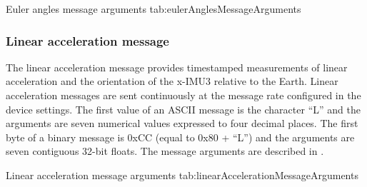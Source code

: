 \begingroup
    \def\tempArgumentA{Roll angle in degrees}
    \def\tempArgumentB{Pitch angle in degrees}
    \def\tempArgumentC{Yaw angle in degrees}
    \dataMessageTable
    {Euler angles message arguments}
    {tab:eulerAnglesMessageArguments}
\endgroup

\begingroup
    \def\tempNameA{Roll angle}
    \def\tempNameB{Pitch angle}
    \def\tempNameC{Yaw angle}
    \def\tempValueA{0}
    \def\tempValueB{0}
    \def\tempValueC{0}
    \def\tempAsciiFirst{A}
    \def\tempAsciiA{0.0000}
    \def\tempAsciiB{0.0000}
    \def\tempAsciiC{0.0000}
    \def\tempBinaryFirst{C1}
    \def\tempBinaryA{00 00 00 00}
    \def\tempBinaryB{00 00 00 00}
    \def\tempBinaryC{00 00 00 00}
    \dataMessageExample
\endgroup

\subsubsection{Linear acceleration message}

The linear acceleration message provides timestamped measurements of linear acceleration and the orientation of the x-IMU3 relative to the Earth.  Linear acceleration messages are sent continuously at the message rate configured in the device settings.  The first value of an \ac{ASCII} message is the character \enquote{L} and the arguments are seven numerical values expressed to four decimal places.  The first byte of a binary message is 0xCC (equal to 0x80 + \enquote{L}) and the arguments are seven contiguous 32-bit floats.  The message arguments are described in .

\begingroup
    \def\tempArgumentA{Quaternion W element}
    \def\tempArgumentB{Quaternion X element}
    \def\tempArgumentC{Quaternion Y element}
    \def\tempArgumentD{Quaternion Z element}
    \def\tempArgumentE{Linear acceleration X axis in g}
    \def\tempArgumentF{Linear acceleration Y axis in g}
    \def\tempArgumentG{Linear acceleration Z axis in g}
    \def\tempCaption{Linear acceleration message arguments}
    \def\tempLabel{tab:linearAccelerationMessageArguments}
    \dataMessageTable
    {Linear acceleration message arguments}
    {tab:linearAccelerationMessageArguments}
\endgroup

\begingroup
    \def\tempNameA{Quaternion W element}
    \def\tempNameB{Quaternion X element}
    \def\tempNameC{Quaternion Y element}
    \def\tempNameD{Quaternion Z element}
    \def\tempNameE{Linear acceleration X axis}
    \def\tempNameF{Linear acceleration Y axis}
    \def\tempNameG{Linear acceleration Z axis}
    \def\tempValueA{1}
    \def\tempValueB{0}
    \def\tempValueC{0}
    \def\tempValueD{0}
    \def\tempValueE{0}
    \def\tempValueF{0}
    \def\tempValueG{0}
    \def\tempAsciiFirst{L}
    \def\tempAsciiA{1.0000}
    \def\tempAsciiB{0.0000}
    \def\tempAsciiC{0.0000}
    \def\tempAsciiD{0.0000}
    \def\tempAsciiE{0.0000}
    \def\tempAsciiF{0.0000}
    \def\tempAsciiG{0.0000}
    \def\tempBinaryFirst{CC}
    \def\tempBinaryA{00 00 80 3F}
    \def\tempBinaryB{00 00 00 00}
    \def\tempBinaryC{00 00 00 00}
    \def\tempBinaryD{00 00 00 00}
    \def\tempBinaryE{00 00 00 00}
    \def\tempBinaryF{00 00 00 00}
    \def\tempBinaryG{00 00 00 00}
    \dataMessageExample
\endgroup

